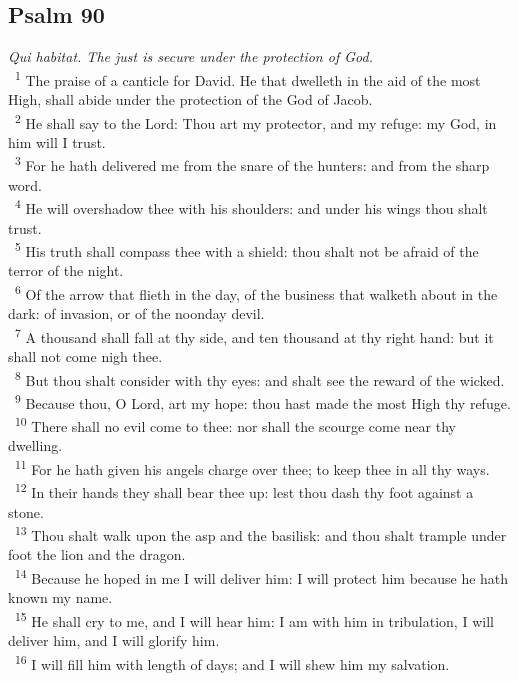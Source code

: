 \documentclass[a5paper,12pt]{article}
\begin{document}
\begin{multicols*}{2}
\section{Psalm 90}
\label{sec:org067370d}
\emph{Qui habitat. The just is secure under the protection of God.}\\

~\textsuperscript{1} The praise of a canticle for David. He that dwelleth in the aid of the most High, shall abide under the protection of the God of Jacob.\\
~\textsuperscript{2} He shall say to the Lord: Thou art my protector, and my refuge: my God, in him will I trust.\\
~\textsuperscript{3} For he hath delivered me from the snare of the hunters: and from the sharp word.\\
~\textsuperscript{4} He will overshadow thee with his shoulders: and under his wings thou shalt trust.\\
~\textsuperscript{5} His truth shall compass thee with a shield: thou shalt not be afraid of the terror of the night.\\
~\textsuperscript{6} Of the arrow that flieth in the day, of the business that walketh about in the dark: of invasion, or of the noonday devil.\\
~\textsuperscript{7} A thousand shall fall at thy side, and ten thousand at thy right hand: but it shall not come nigh thee.\\
~\textsuperscript{8} But thou shalt consider with thy eyes: and shalt see the reward of the wicked.\\
~\textsuperscript{9} Because thou, O Lord, art my hope: thou hast made the most High thy refuge.\\
~\textsuperscript{10} There shall no evil come to thee: nor shall the scourge come near thy dwelling.\\
~\textsuperscript{11} For he hath given his angels charge over thee; to keep thee in all thy ways.\\
~\textsuperscript{12} In their hands they shall bear thee up: lest thou dash thy foot against a stone.\\
~\textsuperscript{13} Thou shalt walk upon the asp and the basilisk: and thou shalt trample under foot the lion and the dragon.\\
~\textsuperscript{14} Because he hoped in me I will deliver him: I will protect him because he hath known my name.\\
~\textsuperscript{15} He shall cry to me, and I will hear him: I am with him in tribulation, I will deliver him, and I will glorify him.\\
~\textsuperscript{16} I will fill him with length of days; and I will shew him my salvation.\\


\end{multicols*}
\end{document}
